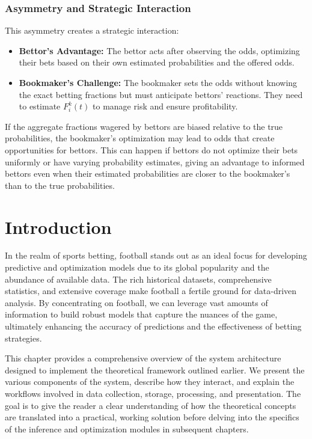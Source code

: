 \subsubsection{Asymmetry and Strategic Interaction}

This asymmetry creates a strategic interaction:

\begin{itemize}
    \item \textbf{Bettor's Advantage:} The bettor acts after observing the odds, optimizing their bets based on their own estimated probabilities and the offered odds.
    \item \textbf{Bookmaker's Challenge:} The bookmaker sets the odds without knowing the exact betting fractions but must anticipate bettors' reactions. They need to estimate \( F_i^k(t) \) to manage risk and ensure profitability.
\end{itemize}

If the aggregate fractions wagered by bettors are biased relative to the true probabilities, the bookmaker's optimization may lead to odds that create opportunities for bettors. This can happen if bettors do not optimize their bets uniformly or have varying probability estimates, giving an advantage to informed bettors even when their estimated probabilities are closer to the bookmaker's than to the true probabilities.



\section{Introduction}

In the realm of sports betting, football stands out as an ideal focus for developing predictive and optimization models due to its global popularity and the abundance of available data. The rich historical datasets, comprehensive statistics, and extensive coverage make football a fertile ground for data-driven analysis. By concentrating on football, we can leverage vast amounts of information to build robust models that capture the nuances of the game, ultimately enhancing the accuracy of predictions and the effectiveness of betting strategies.

This chapter provides a comprehensive overview of the system architecture designed to implement the theoretical framework outlined earlier. We present the various components of the system, describe how they interact, and explain the workflows involved in data collection, storage, processing, and presentation. The goal is to give the reader a clear understanding of how the theoretical concepts are translated into a practical, working solution before delving into the specifics of the inference and optimization modules in subsequent chapters.

